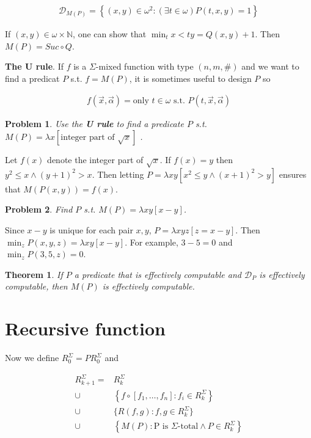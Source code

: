 \documentclass[a4paper, 12pt]{article}
\newtheorem{problem}{Problem}
\newtheorem{theorem}{Theorem}
\newtheorem{problem}{Problem}
\newtheorem{theorem}{Theorem}
\begin{document}
\begin{align*}
    \mathcal{D}_{M(P)} = \left\{ (x, y) \in \omega^2 : (\exists t \in \omega)
    P(t, x, y) = 1 \right\} 
\end{align*}

If $(x, y) \in \omega \times \mathbb{N}$, one can show that $\min_t x < ty =
Q(x, y) + 1$. Then $M(P) = Suc \circ Q$.

\textbf{The U rule}. If $f$ is a $\Sigma$-mixed function with type $(n, m, \#)$
and we want to find a predicat $P$ s.t. $f = M(P)$, it is sometimes useful to
design $P$ so  

\begin{align*}
    f(\overrightarrow{x}, \overrightarrow{\alpha}) = \text{only } t \in \omega
    \text{ s.t. } P(t, \overrightarrow{x}, \overrightarrow{\alpha})
\end{align*}

\begin{problem}
    Use the \textbf{U rule} to find a predicate $P$ s.t. $M(P) = \lambda
    x[\text{integer part of } \sqrt{x}]$ .
\end{problem}

Let $f(x)$ denote the integer part of $\sqrt{x}$. If $f(x) = y$ then $y^2 \leq x
\land (y+1)^2 > x$. Then letting $P = \lambda xy\left[ x^2 \leq y \land (x +
1)^2 > y \right] $ ensures that $M(P(x, y)) = f(x)$.

\begin{problem}
    Find $P$ s.t. $M(P) = \lambda xy\left[ x - y \right] $.
\end{problem}

Since $x - y$ is unique for each pair $x, y$, $P = \lambda xyz [z = x - y]$. Then
$\min_z P(x, y, z) = \lambda xy[x - y]$. For example, $3 - 5 = 0$ and $\min_z
P(3, 5, z) = 0$.

\begin{theorem}
    If $P$ a predicate that is effectively computable and $\mathcal{D}_P$ is
    effectively computable, then $M(P)$ is effectively computable.
\end{theorem}

\section{Recursive function}

Now we define $R_0^{\Sigma} = PR_0^{\Sigma}$ and 

\begin{align*}
    R_{k+1}^{\Sigma} = &R_k^{\Sigma} \\ \cup &\left\{ f \circ \left[ f_1, \ldots,
    f_n \right] : f_i \in R_{k}^{\Sigma} \right\} \\ \cup &\{R(f, g) : f, g \in
R_k^{\Sigma}\} \\ \cup & \left\{M(P) : \text{P is $\Sigma$-total} \land P \in
R_k^{\Sigma}\right\}
\end{align*}
\end{document}
